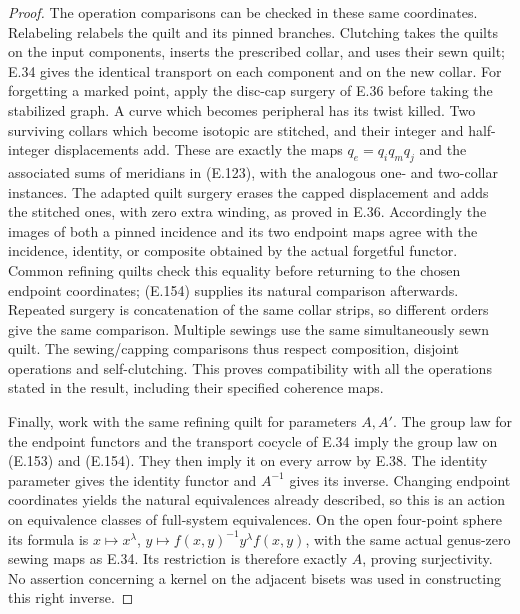 \begin{proof}
The operation comparisons can be checked in these same
coordinates.  Relabeling relabels the quilt and its pinned
branches.  Clutching takes the quilts on the input components,
inserts the prescribed collar, and uses their sewn quilt;
E.34 gives the identical transport on each component and on the
new collar.  For forgetting a marked point, apply the disc-cap
surgery of E.36 before taking the stabilized graph.  A curve
which becomes peripheral has its twist killed.  Two surviving
collars which become isotopic are stitched, and their integer
and half-integer displacements add.  These are exactly the
maps $q_e=q_iq_mq_j$ and the associated sums of meridians in
(E.123), with the analogous one- and two-collar instances.
The adapted quilt surgery erases the capped displacement and
adds the stitched ones, with zero extra winding, as proved in
E.36.  Accordingly the images of both a pinned incidence and
its two endpoint maps agree with the incidence, identity, or
composite obtained by the actual forgetful functor.  Common
refining quilts check this equality before returning to the
chosen endpoint coordinates; (E.154) supplies its natural
comparison afterwards.  Repeated surgery is concatenation of
the same collar strips, so different orders give the same
comparison.  Multiple sewings use the same simultaneously
sewn quilt.  The sewing/capping comparisons thus respect
composition, disjoint operations and self-clutching.  This
proves compatibility with all the operations stated in the
result, including their specified coherence maps.

Finally, work with the same refining quilt for parameters
$A,A'$.  The group law for the endpoint functors and the
transport cocycle of E.34 imply the group law on (E.153) and
(E.154).  They then imply it on every arrow by E.38.  The
identity parameter gives the identity functor and $A^{-1}$
gives its inverse.  Changing endpoint coordinates yields the
natural equivalences already described, so this is an action
on equivalence classes of full-system equivalences.  On the
open four-point sphere its formula is
$x\mapsto x^\lambda$, $y\mapsto f(x,y)^{-1}y^\lambda f(x,y)$,
with the same actual genus-zero sewing maps as E.34.  Its
restriction is therefore exactly $A$, proving surjectivity.
No assertion concerning a kernel on the adjacent bisets was
used in constructing this right inverse.
\end{proof}
